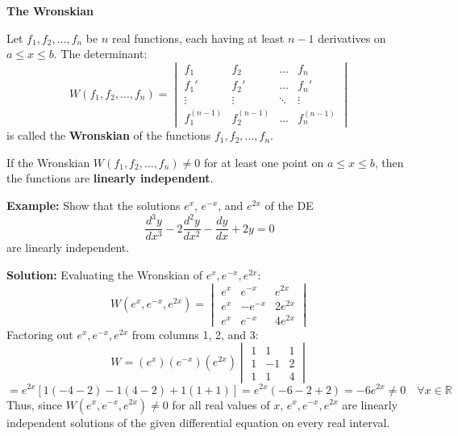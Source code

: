 \documentclass[11pt,a4paper]{article}
\begin{document}
\vspace{3cm}

\begin{center}
    {\large\bfseries\textcolor{AcademicGreen}{The Wronskian}} \\[0.2cm]
    \vspace{0.3cm}
\end{center}
Let $f_1, f_2, \dots, f_n$ be $n$ real functions, each having at least $n-1$ derivatives on $a \le x \le b$. The determinant:
\[
W(f_1, f_2, \dots, f_n) = 
\begin{vmatrix} 
f_1 & f_2 & \dots & f_n \\ 
f_1' & f_2' & \dots & f_n' \\ 
\vdots & \vdots & \ddots & \vdots \\ 
f_1^{(n-1)} & f_2^{(n-1)} & \dots & f_n^{(n-1)} 
\end{vmatrix}
\]
is called the \textbf{Wronskian} of the functions $f_1, f_2, \dots, f_n$.

\vspace{0.15cm}
\noindent If the Wronskian $W(f_1, f_2, \dots, f_n) \neq 0$ for at least one point on $a \le x \le b$, then the functions are \textbf{linearly independent}.

\vspace{0.3cm}
\begin{tcolorbox}[greenbox]
    \textbf{\textcolor{AcademicGreen}{Example:}} Show that the solutions $e^x$, $e^{-x}$, and $e^{2x}$ of the DE
    \[
    \frac{d^3 y}{dx^3} - 2\frac{d^2 y}{dx^2} - \frac{dy}{dx} + 2y = 0
    \]
    are linearly independent.
    
    \vspace{0.15cm}
    \noindent\textbf{Solution:} Evaluating the Wronskian of $e^x, e^{-x}, e^{2x}$:
    \[
    W(e^x, e^{-x}, e^{2x}) = 
    \begin{vmatrix} 
    e^x & e^{-x} & e^{2x} \\ 
    e^x & -e^{-x} & 2e^{2x} \\ 
    e^x & e^{-x} & 4e^{2x} 
    \end{vmatrix}
    \]
    Factoring out $e^x, e^{-x}, e^{2x}$ from columns 1, 2, and 3:
    \[
    W = (e^x)(e^{-x})(e^{2x}) 
    \begin{vmatrix} 
    1 & 1 & 1 \\ 
    1 & -1 & 2 \\ 
    1 & 1 & 4 
    \end{vmatrix}
    \]
    \[
    = e^{2x} \left[ 1(-4 - 2) - 1(4 - 2) + 1(1 + 1) \right] = e^{2x} (-6 - 2 + 2) = -6 e^{2x} \neq 0 \quad \forall x \in \mathbb{R}
    \]
    Thus, since $W(e^x, e^{-x}, e^{2x}) \neq 0$ for all real values of $x$, $e^x, e^{-x}, e^{2x}$ are linearly independent solutions of the given differential equation on every real interval.
\end{tcolorbox}
\end{document}
